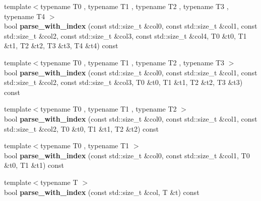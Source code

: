\begin{DoxyCompactItemize}
\item 
\hypertarget{classstrtk_1_1token__grid_1_1row__type_af5b9963352e66a72854b9039c022a8e7}{{\footnotesize template$<$typename T0 , typename T1 , typename T2 , typename T3 , typename T4 $>$ }\\bool {\bfseries parse\-\_\-with\-\_\-index} (const std\-::size\-\_\-t \&col0, const std\-::size\-\_\-t \&col1, const std\-::size\-\_\-t \&col2, const std\-::size\-\_\-t \&col3, const std\-::size\-\_\-t \&col4, T0 \&t0, T1 \&t1, T2 \&t2, T3 \&t3, T4 \&t4) const }\label{classstrtk_1_1token__grid_1_1row__type_af5b9963352e66a72854b9039c022a8e7}

\item 
\hypertarget{classstrtk_1_1token__grid_1_1row__type_a6491a1bb4f51a6bbdb538df8d832f332}{{\footnotesize template$<$typename T0 , typename T1 , typename T2 , typename T3 $>$ }\\bool {\bfseries parse\-\_\-with\-\_\-index} (const std\-::size\-\_\-t \&col0, const std\-::size\-\_\-t \&col1, const std\-::size\-\_\-t \&col2, const std\-::size\-\_\-t \&col3, T0 \&t0, T1 \&t1, T2 \&t2, T3 \&t3) const }\label{classstrtk_1_1token__grid_1_1row__type_a6491a1bb4f51a6bbdb538df8d832f332}

\item 
\hypertarget{classstrtk_1_1token__grid_1_1row__type_a1cdce192085e21cd6e8718ed8507f8f4}{{\footnotesize template$<$typename T0 , typename T1 , typename T2 $>$ }\\bool {\bfseries parse\-\_\-with\-\_\-index} (const std\-::size\-\_\-t \&col0, const std\-::size\-\_\-t \&col1, const std\-::size\-\_\-t \&col2, T0 \&t0, T1 \&t1, T2 \&t2) const }\label{classstrtk_1_1token__grid_1_1row__type_a1cdce192085e21cd6e8718ed8507f8f4}

\item 
\hypertarget{classstrtk_1_1token__grid_1_1row__type_a0108b3133bec89ad8741f4738e55725a}{{\footnotesize template$<$typename T0 , typename T1 $>$ }\\bool {\bfseries parse\-\_\-with\-\_\-index} (const std\-::size\-\_\-t \&col0, const std\-::size\-\_\-t \&col1, T0 \&t0, T1 \&t1) const }\label{classstrtk_1_1token__grid_1_1row__type_a0108b3133bec89ad8741f4738e55725a}

\item 
\hypertarget{classstrtk_1_1token__grid_1_1row__type_a76ff35559b95196da7d0e2ace76155cf}{{\footnotesize template$<$typename T $>$ }\\bool {\bfseries parse\-\_\-with\-\_\-index} (const std\-::size\-\_\-t \&col, T \&t) const }\label{classstrtk_1_1token__grid_1_1row__type_a76ff35559b95196da7d0e2ace76155cf}


\end{DoxyCompactItemize}

